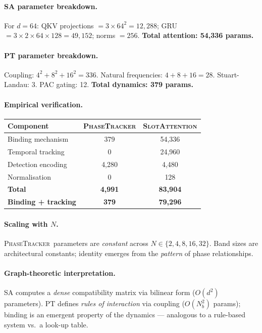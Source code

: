 \documentclass[11pt]{article}
\providecommand{\pt}{\textnormal{\textsc{PhaseTracker}}\xspace}
\providecommand{\sa}{\textnormal{\textsc{SlotAttention}}\xspace}
\begin{document}
\paragraph{SA parameter breakdown.}
For $d = 64$: QKV projections $= 3 \times 64^2 = 12{,}288$;
GRU $= 3 \times 2 \times 64 \times 128 = 49{,}152$; norms $= 256$.
\textbf{Total attention: 54,336 params.}

\paragraph{PT parameter breakdown.}
Coupling: $4^2 + 8^2 + 16^2 = 336$.
Natural frequencies: $4 + 8 + 16 = 28$.
Stuart-Landau: 3. PAC gating: 12.
\textbf{Total dynamics: 379 params.}

\paragraph{Empirical verification.}

\begin{center}
\begin{tabular}{lcc}
\toprule
Component & \pt & \sa \\
\midrule
Binding mechanism & 379 & 54,336 \\
Temporal tracking & 0 & 24,960 \\
Detection encoding & 4,280 & 4,480 \\
Normalisation & 0 & 128 \\
\midrule
\textbf{Total} & \textbf{4,991} & \textbf{83,904} \\
\textbf{Binding + tracking} & \textbf{379} & \textbf{79,296} \\
\bottomrule
\end{tabular}
\end{center}

\paragraph{Scaling with $N$.}
\pt\ parameters are \emph{constant} across $N \in \{2, 4, 8, 16, 32\}$.
Band sizes are architectural constants; identity emerges from the
\emph{pattern} of phase relationships.

\paragraph{Graph-theoretic interpretation.}
SA computes a \emph{dense} compatibility matrix via bilinear form
($O(d^2)$ parameters).
PT defines \emph{rules of interaction} via coupling ($O(N_b^2)$ params);
binding is an emergent property of the dynamics --- analogous to a
rule-based system vs.\ a look-up table.
\end{document}
